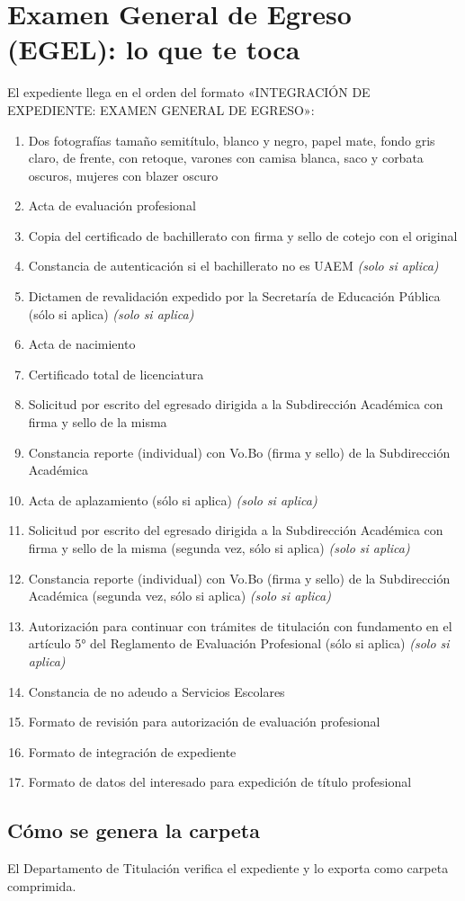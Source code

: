 \section{Examen General de Egreso (EGEL): lo que te toca}
El expediente llega en el orden del formato «INTEGRACIÓN DE EXPEDIENTE: EXAMEN GENERAL DE EGRESO»:
\begin{enumerate}
  \item Dos fotografías tamaño semitítulo, blanco y negro, papel mate, fondo gris claro, de frente, con retoque, varones con camisa blanca, saco y corbata oscuros, mujeres con blazer oscuro
  \item Acta de evaluación profesional
  \item Copia del certificado de bachillerato con firma y sello de cotejo con el original
  \item Constancia de autenticación si el bachillerato no es UAEM \emph{(solo si aplica)}
  \item Dictamen de revalidación expedido por la Secretaría de Educación Pública (sólo si aplica) \emph{(solo si aplica)}
  \item Acta de nacimiento
  \item Certificado total de licenciatura
  \item Solicitud por escrito del egresado dirigida a la Subdirección Académica con firma y sello de la misma
  \item Constancia reporte (individual) con Vo.Bo (firma y sello) de la Subdirección Académica
  \item Acta de aplazamiento (sólo si aplica) \emph{(solo si aplica)}
  \item Solicitud por escrito del egresado dirigida a la Subdirección Académica con firma y sello de la misma (segunda vez, sólo si aplica) \emph{(solo si aplica)}
  \item Constancia reporte (individual) con Vo.Bo (firma y sello) de la Subdirección Académica (segunda vez, sólo si aplica) \emph{(solo si aplica)}
  \item Autorización para continuar con trámites de titulación con fundamento en el artículo 5° del Reglamento de Evaluación Profesional (sólo si aplica) \emph{(solo si aplica)}
  \item Constancia de no adeudo a Servicios Escolares
  \item Formato de revisión para autorización de evaluación profesional
  \item Formato de integración de expediente
  \item Formato de datos del interesado para expedición de título profesional
\end{enumerate}
\subsection{Cómo se genera la carpeta}
El Departamento de Titulación verifica el expediente y lo exporta como carpeta comprimida.
